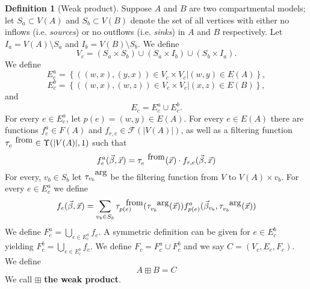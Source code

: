 \documentclass[pdflatex,sn-basic]{sn-jnl}%
\theoremstyle{definition}
\newtheorem{definition}{Definition}
\newcommand{\abs}[1]{\lvert #1 \rvert}%
\newcommand{\betavec}{\vec{\beta}}
\newcommand{\xvec}{\vec{x}}
\newcommand{\fr}{\ensuremath{\mathcal F}}
\newcommand{\tauf}{\tau^{\mbox{\tiny from}}}
\newcommand{\taua}{\tau^{\mbox{\tiny arg}}}
\begin{document}
\begin{definition}[Weak product]
    Suppose $A$ and $B$ are two compartmental models; let $S_a\subset V(A)$ and $S_b\subset V(B)$ denote the set of all vertices with either no inflows (i.e. \emph{sources}) or no outflows (i.e. \emph{sinks}) in $A$ and $B$ respectively. Let $I_a=V(A)\setminus S_a$ and $I_b=V(B)\setminus S_b$. We define
    \begin{equation}
        V_c = (S_a\times S_b) \cup (S_a\times I_b) \cup (S_b\times I_a).
    \end{equation}
    We define
    \begin{equation}
        E_c^a = \left\{((w,x),(y,x))\in V_c\times V_c\vert (w,y)\in E(A) \right\},
    \end{equation}
    \begin{equation}
        E_c^b = \left\{((w,x),(w,z))\in V_c\times V_c\vert (x,z)\in E(B) \right\},
    \end{equation}
    and
    \begin{equation}
        E_c = E_c^a\cup E_c^b.
    \end{equation}
    For every $e\in E_c^a$, let $p(e) = (w,y)\in E(A)$. For every $e\in E(A)$ there are functions $f^a_{e}\in F(A)$ and $f_{r,e}\in \fr(\abs{V(A)})$, as well as a filtering function $\tauf_{e}\in\Upsilon(\abs{V(A)}, 1)$ such that
    \begin{equation}
        f^a_{e}(\betavec, \xvec) = \tauf_e(\xvec)\cdot f_{r,e}(\betavec, \xvec)
    \end{equation}
    For every, $v_b\in S_b$ let $\taua_{v_b}$ be the filtering function from $V$ to $V(A)\times v_b$. For every $e\in E_c^a$ we define
    \begin{equation}
        f_e(\betavec, \xvec) = \sum\limits_{v_b\in S_b}\tauf_{p(e)}(\taua_{v_b}(\xvec))f^a_{p(e)}(\betavec_{v_b}, \taua_{v_b}(\xvec))
    \end{equation}
    We define $F_c^a = \bigcup\limits_{e\in E_c^a}f_e$. A symmetric definition can be given for $e\in E_c^b$ yielding $F_c^b = \bigcup\limits_{e\in E_c^b}f_e$. We define $F_c = F_c^a\cup F_c^b$ and we say $C = (V_c, E_c, F_c)$. We define
    \begin{equation}
        A\boxplus B = C
    \end{equation} We call $\boxplus$ \textbf{the weak product}.

\end{definition}
\end{document}
